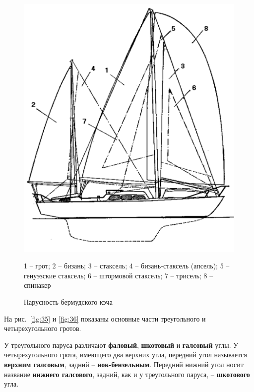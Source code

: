 \documentclass[a4paper, 12pt, twoside, final]{scrbook}
\begin{document}
\begin{figure}[htbp]
\begin{centering}
\includegraphics{pics/Parusnost_bermudskogo_kecha}
\par\end{centering}

\protect\caption{\label{fig:34}Парусность
бермудского кэча}


\centering{}\small 1 \--- грот; 2 \--- бизань; 3 \--- стаксель; 4 \--- бизань-стаксель (апсель);
5 \--- генуэзские стаксель; 6 \--- штормовой стаксель; 7 \--- трисель; 8 \--- спинакер
\end{figure}


На рис.~\ref{fig:35} и \ref{fig:36} показаны основные части треугольного и четырехугольного гротов.

У треугольного паруса различают \textbf{фаловый}, \textbf{шкотовый}
и \textbf{галсовый} углы. У четырехугольного грота, имеющего два верхних
угла, передний угол называется \textbf{верхним галсовым}, задний \---
\textbf{нок-бензельным}. Передний нижний угол носит название \textbf{нижнего галсового}, задний, как и у треугольного паруса, \--- \textbf{шкотового}
угла.
\end{document}

